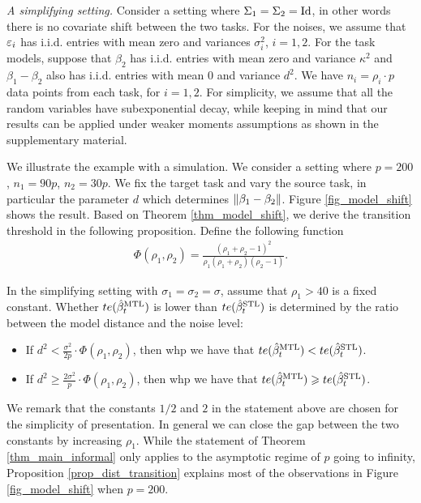 \textit{A simplifying setting.}\label{ex_basic}
	Consider a setting where $\Sigma_1 = \Sigma_2 = \operatorname{Id}$, in other words there is no covariate shift between the two tasks. For the noises, we assume that ${\varepsilon}_i$ has i.i.d. entries with mean zero and variances $\sigma_i^2$, $i=1,2$. 
	For the task models, suppose that $\beta_2$ has i.i.d. entries with mean zero and variance $\kappa^2$ and $\beta_1 - \beta_2$ also has i.i.d. entries with mean $0$ and variance $d^2$.
	We have $n_i = \rho_i \cdot p$ data points from each task, for $i = 1, 2$.
	For simplicity, we assume that all the random variables have subexponential decay, while keeping in mind that our results can be applied under weaker moments assumptions as shown in the supplementary material.

We illustrate the example with a simulation.
We consider a setting where $p = 200$, $n_1 = 90p$, $n_2 = 30p$.
We fix the target task and vary the source task, in particular the parameter $d$ which determines $\|\beta_1 - \beta_2\|$.
Figure \ref{fig_model_shift} shows the result.
Based on Theorem \ref{thm_model_shift}, we derive the transition threshold in the following proposition.
Define the following function
\begin{align*}
	\Phi(\rho_1, \rho_2) = \frac{(\rho_1 + \rho_2 - 1)^2}{\rho_1 (\rho_1 + \rho_2) (\rho_2 - 1)}.
\end{align*}

\begin{proposition}\label{prop_dist_transition}
	In the simplifying setting with $\sigma_1 = \sigma_2 = \sigma$, assume that $\rho_1 > 40$ is a fixed constant.
	Whether $te(\hat{\beta}_t^{\text{MTL}})$ is lower than $te(\hat{\beta}_t^{\text{STL}})$ is determined by the ratio between the model distance and the noise level:
	\begin{itemize}
		\item If ${d^2} < \frac {\sigma^2} {2p} \cdot \Phi(\rho_1, \rho_2)$, then whp we have that $te(\hat{\beta}_t^{\text{MTL}}) < te(\hat{\beta}_t^{\text{STL}})$.
		\item If ${d^2} \ge \frac {2\sigma^2} {p} \cdot \Phi(\rho_1, \rho_2)$, then whp we have that $te(\hat{\beta}_t^{\text{MTL}}) \geqslant te(\hat{\beta}_t^{\text{STL}})$.
	\end{itemize}
\end{proposition}

We remark that the constants $1/2$ and $2$ in the statement above are chosen for the simplicity of presentation.
In general we can close the gap between the two constants by increasing $\rho_1$.
While the statement of Theorem \ref{thm_main_informal} only applies to the asymptotic regime of $p$ going to infinity, Proposition \ref{prop_dist_transition} explains most of the observations in Figure \ref{fig_model_shift} when $p = 200$.

